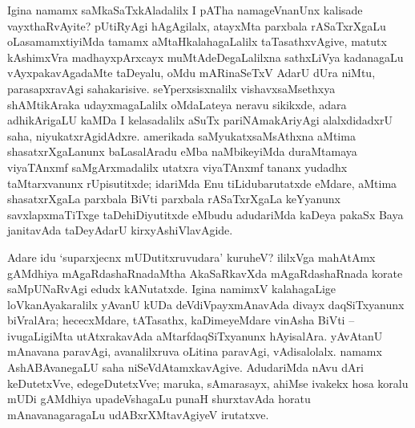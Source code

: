 \newpage

Igina namamx saMkaSaTxkAladalilx I pATha namageVnanUnx kalisade vayxthaRvAyite? pUtiRyAgi hAgAgilalx, atayxMta parxbala rASaTxrXgaLu oLasamamxtiyiMda tamamx aMtaHkalaha\-gaLalilx taTasathxvAgive, matutx kAshimxVra madhayxpArxcayx muMtAdeDegaLalilxna sathxLiVya kadanagaLu vAyxpakavAgadaMte taDeyalu, oMdu mARinaSeTxV AdarU dUra niMtu, parasapxravAgi sahakarisive. seYperxsisxnalilx vishavxsaMsethxya shAMtikAraka udayxmagaLalilx oMdaLateya neravu sikikxde, adara adhikArigaLU kaMDa I kelasadalilx aSuTx pariNAmakAriyAgi alalxdidadxrU saha, niyukatxrAgidAdxre. amerikada saMyukatxsaMsAthxna aMtima shasatxrXgaLanunx baLasalAradu eMba naMbikeyiMda duraMtamaya viyaTAnxmf saMgArxmadalilx utatxra viyaTAnxmf tananx yudadhx taMtarxvanunx rUpisutitxde; idariMda Enu tiLidubarutatxde eMdare, aMtima shasatxrXgaLa parxbala BiVti parxbala rASaTxrXgaLa keYyanunx savxlapxmaTiTxge taDehiDiyutitxde eMbudu adudariMda kaDeya pakaSx Baya janitavAda taDeyAdarU kirxyAshiVlavAgide. 

Adare idu `suparxjecnx mUDutitxruvudara' kuruheV? ililxVga mahAtAmx gAMdhiya mAgaRdashaRnadaMtha AkaSaRkavXda mAgaRdashaRnada korate saMpUNaRvAgi edudx kANutatxde. Igina namimxV kalahagaLige loVkanAyakaralilx yAvanU kUDa deVdiVpayxmAnavAda divayx daqSiTxyanunx biVralAra; hececxMdare, tATasathx, kaDimeyeMdare vinAsha BiVti -- ivugaLigiMta utAtxrakavAda aMtarfdaqSiTxyanunx hAyisalAra. yAvAtanU mAnavana paravAgi, avanalilxruva oLitina paravAgi, vAdisalolalx. namamx AshABAvanegaLU saha niSeVdAtamxkavAgive. AdudariMda nAvu dAri keDutetxVve, edegeDutetxVve; maruka, sAmarasayx, ahiMse ivakekx hosa koralu mUDi gAMdhiya upadeVshagaLu punaH shurxtavAda horatu mAnavanagaragaLu udABxrXMtavAgiyeV irutatxve.



